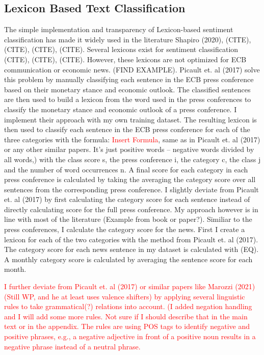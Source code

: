 \documentclass[review]{elsarticle}
\begin{document}
\subsection{Lexicon Based Text Classification}
The simple implementation and transparency of Lexicon-based sentiment classification has made it widely used in the literature Shapiro (2020), (CITE), (CITE), (CITE), (CITE). Several lexicons exist for sentiment classification (CITE), (CITE), (CITE). However, these lexicons are not optimized for ECB communication or economic news. (FIND EXAMPLE). Picault et. al (2017) solve this problem by manually classifying each sentence in the ECB press conference based on their monetary stance and economic outlook. The classified sentences are then used to build a lexicon from the word used in the press conferences to classify the monetary stance and economic outlook of a press conference. I implement their approach with my own training dataset. The resulting lexicon is then used to classify each sentence in the ECB press conference for each of the three categories with the formula:
\textcolor{red}{Insert Formula}, same as in Picault et. al (2017) or any other similar papers. It’s just positive words – negative words divided by all words,)
with the class score s, the press conference i, the category c, the class j and the number of word occurrences n. A final score for each category in each press conference is calculated by taking the averaging the category score over all sentences from the corresponding press conference.
I slightly deviate from Picault et. al (2017) by first calculating the category score for each sentence instead of directly calculating score for the full press conference. My approach however is in line with most of the literature (Example from book or paper?).
Similiar to the press conferences, I calculate the category score for the news. First I create a lexicon for each of the two categories with the method from Picault et. al (2017). The category score for each news sentence in my dataset is calculated with (EQ). A monthly category score is calculated by averaging the sentence score for each month.

\textcolor{red}{I further deviate from Picault et. al (2017) or similar papers like Marozzi (2021) (Still WP, and he at least uses valence shifters) by applying several linguistic rules to take grammatical(?) relations into account.
(I added negation handling and I will add some more rules. Not sure if I should describe that in the main text or in the appendix. The rules are using POS tags to identify negative and positive phrases, e.g., a negative adjective in front of a positive noun results in a negative phrase instead of a neutral phrase.}
\end{document}
